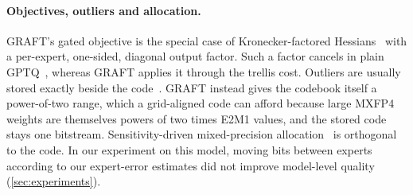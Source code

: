 \paragraph{Objectives, outliers and allocation.} GRAFT's gated objective is the special case of
Kronecker-factored Hessians~\citep{fastkron2026} with a per-expert, one-sided, diagonal output factor. Such a factor
cancels in plain GPTQ~\citep{kronq2026}, whereas GRAFT applies it through the trellis cost. Outliers are usually
stored exactly beside the code~\citep{dettmers2023spqr,kim2023squeezellm,owq2024,icquant}. GRAFT instead gives the
codebook itself a power-of-two range, which a grid-aligned code can afford because large MXFP4 weights are themselves
powers of two times E2M1 values, and the stored code stays one bitstream. Sensitivity-driven mixed-precision
allocation~\citep{dong2019hawq,higgs2025} is orthogonal to the code. In our experiment on this model, moving bits between
experts according to our expert-error estimates did not improve model-level quality (\cref{sec:experiments}).

